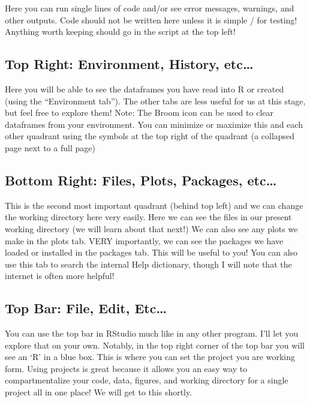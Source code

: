 \documentclass[
  letterpaper,
  DIV=11,
  numbers=noendperiod]{scrartcl}
\begin{document}
Here you can run single lines of code and/or see error messages,
warnings, and other outputs. Code should not be written here unless it
is simple / for testing! Anything worth keeping should go in the script
at the top left!

\subsection{\texorpdfstring{\textbf{Top Right}: Environment, History,
etc\ldots{}}{Top Right: Environment, History, etc\ldots{}}}

Here you will be able to see the dataframes you have read into R or
created (using the ``Environment tab''). The other tabs are less useful
for us at this stage, but feel free to explore them! Note: The Broom
icon can be used to clear dataframes from your environment. You can
minimize or maximize this and each other quadrant using the symbols at
the top right of the quadrant (a collapsed page next to a full page)

\subsection{\texorpdfstring{\textbf{Bottom Right}: Files, Plots,
Packages,
etc\ldots{}}{Bottom Right: Files, Plots, Packages, etc\ldots{}}}

This is the second most important quadrant (behind top left) and we can
change the working directory here very easily. Here we can see the files
in our present working directory (we will learn about that next!) We can
also see any plots we make in the plots tab. VERY importantly, we can
see the packages we have loaded or installed in the packages tab. This
will be useful to you! You can also use this tab to search the internal
Help dictionary, though I will note that the internet is often more
helpful!

\subsection{\texorpdfstring{\textbf{Top Bar}: File, Edit,
Etc\ldots{}}{Top Bar: File, Edit, Etc\ldots{}}}

You can use the top bar in RStudio much like in any other program. I'll
let you explore that on your own. Notably, in the top right corner of
the top bar you will see an `R' in a blue box. This is where you can set
the project you are working form. Using projects is great because it
allows you an easy way to compartmentalize your code, data, figures, and
working directory for a single project all in one place! We will get to
this shortly.
\end{document}
